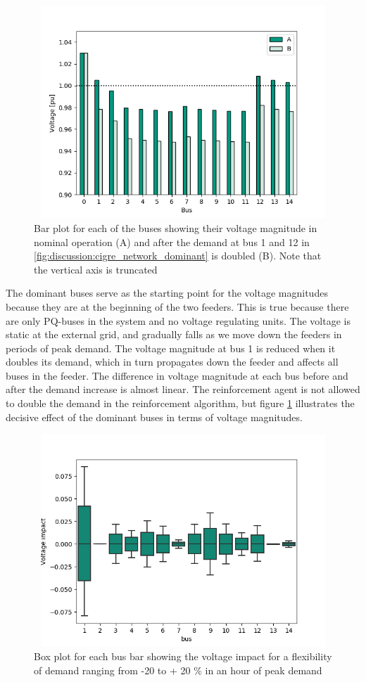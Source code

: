 \documentclass[class=book, crop=false]{standalone}
\begin{document}
\begin{figure}[ht!]
    \center
\includegraphics[height=8cm, width=12cm]{figures/double_large_load.png}
    \caption[size = 9]{Bar plot for each of the buses showing their voltage magnitude in nominal operation (A) and after the demand at bus 1 and 12 in \ref{fig:discussion:cigre_network_dominant} is doubled (B). Note that the vertical axis is truncated}
    \label{fig:discussion:double_large_load}
\end{figure}
The dominant buses serve as the starting point for the voltage magnitudes because they are at the beginning of the two feeders. This is true because there are only PQ-buses in the system and no voltage regulating units. The voltage is static at the external grid, and gradually falls as we move down the feeders in periods of peak demand. The voltage magnitude at bus 1 is reduced when it doubles its demand, which in turn propagates down the feeder and affects all buses in the feeder. The difference in voltage magnitude at each bus before and after the demand increase is almost linear. The reinforcement agent is not allowed to double the demand in the reinforcement algorithm, but figure \ref{fig:discussion:double_large_load} illustrates the decisive effect of the dominant buses in terms of voltage magnitudes.

\begin{figure}[hb!]
    \center
\includegraphics[height=8cm, width=12cm]{figures/voltage_impact.png}
    \caption[size = 9]{Box plot for each bus bar showing the voltage impact for a flexibility of demand ranging from -20 to + 20 \% in an hour of peak demand}
    \label{fig:discussion:voltage_impact}
\end{figure}
\end{document}
